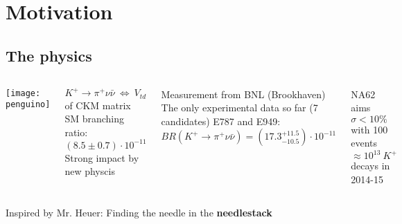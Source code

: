 \section{Motivation}
\subsection{The physics}

\begin{frame}{}{}
	\begin{columns}
	 		\begin{center} 
				\texttt{[image: penguino]}
			\end{center}
	    	\begin{block}{$K^+ \rightarrow \pi^+ \nu \bar{\nu} ~\Leftrightarrow ~
	    	V_{td}$ of CKM matrix} SM branching ratio: $(8.5\pm 0.7)\cdot 10^{-11}$ \\
	    	Strong impact by new physcis
			\end{block}
			\begin{block}{Measurement from BNL (Brookhaven)}
				The only experimental data so far (7 candidates)
	    		E787 and E949:\\
	    		$BR(K^+ \rightarrow \pi^+ \nu \bar{\nu})=(17.3^{+11.5}_{-10.5})\cdot
	    		10^{-11}$
			\end{block}
			\begin{exampleblock}{NA62 aims $\sigma < 10\%$ with 100 events}
	    		$\approx 10^{13} ~ K^+$ decays in 2014-15
			\end{exampleblock}
	\end{columns}
	\begin{block}{}
		Inspired by Mr. Heuer: Finding the needle in the \textbf{needlestack}
	\end{block}
\end{frame}


%	
%	
%


